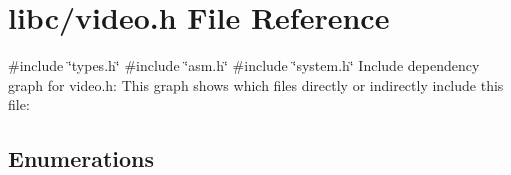 \hypertarget{a00044}{}\section{libc/video.h File Reference}
\label{a00044}
{\ttfamily \#include \char`\"{}types.\+h\char`\"{}}\newline
{\ttfamily \#include \char`\"{}asm.\+h\char`\"{}}\newline
{\ttfamily \#include \char`\"{}system.\+h\char`\"{}}\newline
Include dependency graph for video.\+h\+:
This graph shows which files directly or indirectly include this file\+:
\subsection*{Enumerations}

